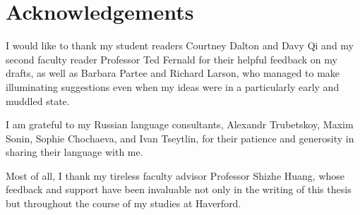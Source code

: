 \section*{Acknowledgements}
I would like to thank my student readers Courtney Dalton and Davy Qi and my second faculty reader Professor Ted Fernald for their helpful feedback on my drafts, as well as Barbara Partee and Richard Larson, who managed to make illuminating suggestions even when my ideas were in a particularly early and muddled state.

I am grateful to my Russian language consultants, Alexandr Trubetskoy, Maxim Sonin, Sophie Chochaeva, and Ivan Tseytlin, for their patience and generosity in sharing their language with me.

Most of all, I thank my tireless faculty advisor Professor Shizhe Huang, whose feedback and support have been invaluable not only in the writing of this thesis but throughout the course of my studies at Haverford.